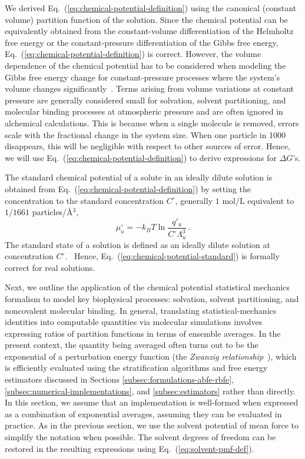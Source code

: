 \documentclass[9pt,bestpractices]{livecoms}
\begin{document}
We derived Eq.~(\ref{eq:chemical-potential-definition}) using the canonical (constant volume) partition function of the solution. Since the chemical potential can be equivalently obtained from the constant-volume differentiation of the Helmholtz free energy or the constant-pressure differentiation of the Gibbs free energy, Eq.~(\ref{eq:chemical-potential-definition}) is correct. However, the volume dependence of the chemical potential has to be considered when modeling the Gibbs free energy change for constant-pressure processes where the system's volume changes significantly~\cite{gilson1997statisticalthermodynamic}. Terms arising from volume variations at constant pressure are generally considered small for solvation, solvent partitioning, and molecular binding processes at atmospheric pressure and are often ignored in alchemical calculations.  This is because when a single molecule is removed, errors scale with the fractional change in the system size.  When one particle in 1000 disappears, this will be negligible with respect to other sources of error. Hence, we will use Eq.~(\ref{eq:chemical-potential-definition}) to derive expressions for $\Delta G$'s.

The standard chemical potential of a solute in an ideally dilute solution is obtained from Eq.~(\ref{eq:chemical-potential-definition}) by setting the concentration to the standard concentration $C^\circ$, generally $1$ mol/L equivalent to $1/1661$ particles/\AA$^{3}$, 
\begin{equation}
  \mu_u^\circ = -k_B T \ln \frac{q'_u}{C^\circ \Lambda_u^3} \, .
  \label{eq:chemical-potential-standard}
\end{equation}
The standard state of a solution is defined as an ideally dilute solution at concentration $C^\circ$.~\cite{levine2009physicalchemistrybook6ed} Hence, Eq.~(\ref{eq:chemical-potential-standard}) is formally correct for real solutions.

Next, we outline the application of the chemical potential statistical mechanics formalism to model key biophysical processes: solvation, solvent partitioning, and noncovalent molecular binding. In general, translating statistical-mechanics identities into computable quantities via molecular simulations involves expressing ratios of partition functions in terms of ensemble averages. In the present context, the quantity being averaged often turns out to be the exponential of a perturbation energy function (the \textit{Zwanzig relationship}~\cite{zwanzig1954hightemperature}), which is efficiently evaluated using the stratification algorithms and free energy estimators discussed in Sections \ref{subsec:formulations-abfe-rbfe}, \ref{subsec:numerical-implementations},  and \ref{subsec:estimators} rather than directly. In this section, we assume that an implementation is well-formed when expressed as a combination of exponential averages, assuming they can be evaluated in practice. As in the previous section, we use the solvent potential of mean force to simplify the notation when possible. The solvent degrees of freedom can be restored in the resulting expressions using Eq.~(\ref{eq:solvent-pmf-def}). 
\end{document}

